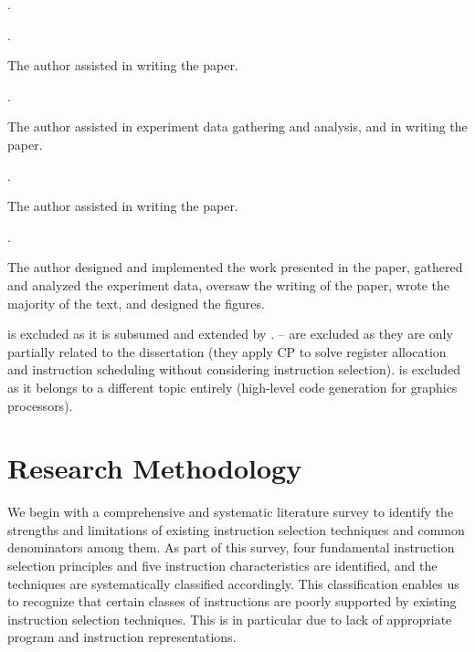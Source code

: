 \begin{publications}[resume]
  \item {}
    .
  \item {}
    .
    \begin{authorsContribution}
      The author assisted in writing the paper.
    \end{authorsContribution}
  \item {}
    .
    \begin{authorsContribution}
      The author assisted in experiment data gathering and analysis, and in
      writing the paper.
    \end{authorsContribution}
  \item {}
    .
    \begin{authorsContribution}
      The author assisted in writing the paper.
    \end{authorsContribution}
  \item {}
    .
    \begin{authorsContribution}
      The author designed and implemented the work presented in the paper,
      gathered and analyzed the experiment data, oversaw the writing of the
      paper, wrote the majority of the text, and designed the figures.
    \end{authorsContribution}
\end{publications}
%
 is excluded as it is subsumed and extended by
.
%
-- are excluded as they are only
partially related to the dissertation (they apply \glsdesc{CP} to solve
\gls{register allocation} and \gls{instruction scheduling} without considering
\gls{instruction selection}).
%
 is excluded as it belongs to a different topic
entirely (high-level code generation for graphics processors).


\section{Research Methodology}

We begin with a comprehensive and systematic literature survey to identify the
strengths and limitations of existing \gls{instruction selection} techniques and
common denominators among them.
%
As part of this survey, four fundamental \gls{instruction selection}
\glspl{principle} and five \glspl{instruction characteristic} are identified,
and the techniques are systematically classified accordingly.
%
This classification enables us to recognize that certain classes of
\glspl{instruction} are poorly supported by existing \gls{instruction selection}
techniques.
%
This is in particular due to lack of appropriate \gls{program} and
\gls{instruction} representations.

